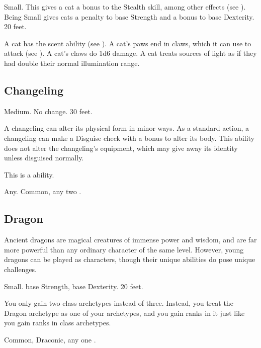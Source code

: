 
             Small. This gives a cat a  bonus to the Stealth skill, among other effects (see ).
             Being Small gives cats a  penalty to base Strength and a  bonus to base Dexterity.
             20 feet.
            \begin{itemize}
                 A cat has the scent ability (see ).
                 A cat's paws end in claws, which it can use to attack (see ). A cat's claws do 1d6 damage.
                 A cat treats sources of light as if they had double their normal illumination range.
            \end{itemize}

    \subsection{Changeling}

         Medium.
         No change.
         30 feet.
        \begin{itemize}
             A changeling can alter its physical form in minor ways. As a standard action, a changeling can make a Disguise check with a  bonus to alter its body. This ability does not alter the changeling's equipment, which may give away its identity unless disguised normally.

            This is a  ability.
        \end{itemize}
         Any.
         Common, any two .

    \subsection{Dragon}
        Ancient dragons are magical creatures of immense power and wisdom, and are far more powerful than any ordinary character of the same level.
        However, young dragons can be played as characters, though their unique abilities do pose unique challenges.

         Small.
          base Strength,  base Dexterity.
         20 feet.
        \begin{itemize}
             You only gain two class archetypes instead of three.
                Instead, you treat the Dragon archetype as one of your archetypes, and you gain ranks in it just like you gain ranks in class archetypes.
        \end{itemize}
         Common, Draconic, any one .

